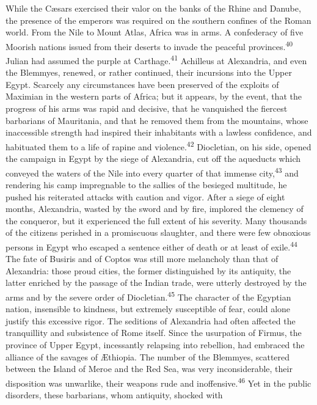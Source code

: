 While the Cæsars exercised their valor on the banks of the Rhine
and Danube, the presence of the emperors was required on the
southern confines of the Roman world. From the Nile to Mount
Atlas, Africa was in arms. A confederacy of five Moorish nations
issued from their deserts to invade the peaceful provinces.\textsuperscript{40}
Julian had assumed the purple at Carthage.\textsuperscript{41} Achilleus at
Alexandria, and even the Blemmyes, renewed, or rather continued,
their incursions into the Upper Egypt. Scarcely any circumstances
have been preserved of the exploits of Maximian in the western
parts of Africa; but it appears, by the event, that the progress
of his arms was rapid and decisive, that he vanquished the
fiercest barbarians of Mauritania, and that he removed them from
the mountains, whose inaccessible strength had inspired their
inhabitants with a lawless confidence, and habituated them to a
life of rapine and violence.\textsuperscript{42} Diocletian, on his side, opened
the campaign in Egypt by the siege of Alexandria, cut off the
aqueducts which conveyed the waters of the Nile into every
quarter of that immense city,\textsuperscript{43} and rendering his camp
impregnable to the sallies of the besieged multitude, he pushed
his reiterated attacks with caution and vigor. After a siege of
eight months, Alexandria, wasted by the sword and by fire,
implored the clemency of the conqueror, but it experienced the
full extent of his severity. Many thousands of the citizens
perished in a promiscuous slaughter, and there were few obnoxious
persons in Egypt who escaped a sentence either of death or at
least of exile.\textsuperscript{44} The fate of Busiris and of Coptos was still
more melancholy than that of Alexandria: those proud cities, the
former distinguished by its antiquity, the latter enriched by the
passage of the Indian trade, were utterly destroyed by the arms
and by the severe order of Diocletian.\textsuperscript{45} The character of the
Egyptian nation, insensible to kindness, but extremely
susceptible of fear, could alone justify this excessive rigor.
The seditions of Alexandria had often affected the tranquillity
and subsistence of Rome itself. Since the usurpation of Firmus,
the province of Upper Egypt, incessantly relapsing into
rebellion, had embraced the alliance of the savages of Æthiopia.
The number of the Blemmyes, scattered between the Island of Meroe
and the Red Sea, was very inconsiderable, their disposition was
unwarlike, their weapons rude and inoffensive.\textsuperscript{46} Yet in the
public disorders, these barbarians, whom antiquity, shocked with
